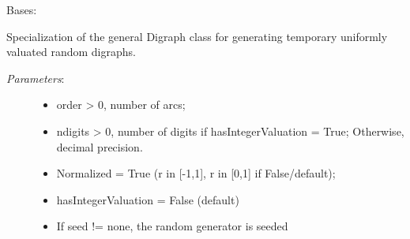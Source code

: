 \documentclass[letterpaper,10pt,english]{sphinxmanual}
\begin{document}
\begin{fulllineitems}
\label{techDoc:randomDigraphs.RandomValuationDigraph}
Bases: {\hyperref[techDoc:digraphs.Digraph]{\emph{}}}

Specialization of the general Digraph class for generating
temporary uniformly valuated random digraphs.
\begin{description}
\item[{\emph{Parameters}:}] \leavevmode\begin{itemize}
\item {} 
order \textgreater{} 0, number of arcs;

\item {} 
ndigits \textgreater{} 0, number of digits if hasIntegerValuation = True;
Otherwise, decimal precision.

\item {} 
Normalized = True (r in {[}-1,1{]}, r in {[}0,1{]} if False/default);

\item {} 
hasIntegerValuation = False (default)

\item {} 
If seed != none, the random generator is seeded

\end{itemize}


\end{description}
\end{fulllineitems}
\end{document}
